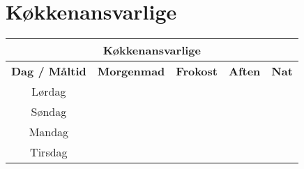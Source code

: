 \documentclass[../../main.tex]{subfiles}
\begin{document}
\section{Køkkenansvarlige}
\begin{center}
\begin{tabularx}{0.7\textwidth}{|c|X|X|X|X|}
\hline \multicolumn{5}{|c|}{\textbf{Køkkenansvarlige}} \\
\hline \textbf{Dag / Måltid} & \textbf{Morgenmad} & \textbf{Frokost} & \textbf{Aften} & \textbf{Nat} \\
\hline
\hline Lørdag   &  &  &  &  \\
\hline Søndag   &  &  &  &  \\
\hline Mandag   &  &  &  &  \\
\hline Tirsdag  &  &  &  &  \\
\hline
\end{tabularx}
\end{center}
\end{document}
